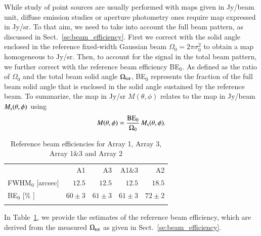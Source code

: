 {\rev While study of point sources are usually performed with maps given in
Jy/beam unit, diffuse emission studies or aperture photometry ones
require map expressed in Jy/sr. To that aim, we need to take into
account the full beam pattern, as discussed in Sect.~\ref{se:beam_efficiency}.}
First we correct with the solid angle enclosed in the
reference fixed-width Gaussian beam $\Omega_{0} = 2\pi \sigma_0^2$ to
obtain a map homogeneous to Jy/sr. Then, to account for the signal in
the total beam pattern, we further correct with the reference beam
efficiency BE$_{0}$. As defined as the ratio of $\Omega_{0}$ and the
total beam solid angle $\Omega_{\rm{tot}}$, BE$_{0}$ represents the
fraction of the full beam solid angle that is enclosed in the solid
angle sustained by the reference beam. To summarize, the map in Jy/sr
$M(\theta, \phi)$ relates to the map in Jy/beam
$M_{\rm{s}}(\theta, \phi)$ using
%
\begin{equation}
M(\theta, \phi) = \frac{\rm{BE}_{0}}{\Omega_{0}} \, M_{\rm{s}}(\theta, \phi).
\label{eq:jybeam_to_jysr}
\end{equation}
%
\begin{table}[!htbp]
  \caption[]{Reference beam efficiencies for Array 1, Array 3, Array 1\&3 and Array 2}
  \label{tab:reference_beam_efficiency}
  \centering    
  \begin{tabular}{lrrrr}
    \hline\hline
    \noalign{\smallskip}
    & A1 & A3  & A1\&3 & A2 \\
    \noalign{\smallskip}
    \hline
    \noalign{\smallskip}
    FWHM$_{0}$ [arcsec]          & $12.5$     &  $12.5$     & $12.5$     & $18.5$     \\
    BE$_{0}$   [\% ]             & $60 \pm 3$ &  $61 \pm 3$ & $61 \pm 3$ & $72 \pm 2$ \\
        \noalign{\smallskip}
    \hline
  \end{tabular}
\end{table}
%
{\rev In Table~\ref{tab:reference_beam_efficiency}, we provide the
estimates of the reference beam efficiency, which are derived from the
measured $\Omega_{\rm{tot}}$ as given in
Sect.~\ref{se:beam_efficiency}.}


